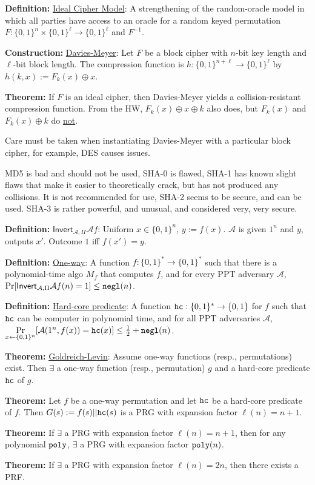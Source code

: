 \documentclass[10pt]{article}
\newcommand{\AAA}{\mathcal{A}}
\newcommand{\defn}[1]{{\bf Definition:} \underline{#1}}
\newcommand{\thm}[1]{{\bf Theorem:} \underline{#1}}
\newcommand{\con}[1]{{\bf Construction:} \underline{#1}}
\newcommand{\ExptInvtArgs}{\mathsf{Invert}_{\AAA,\Pi}}
\newcommand{\ExptInvt}{\ExptInvtArgs{\AAA}{f}}
\newcommand{\xor}{\oplus}
\newcommand{\negl}{{\tt negl}}
\newcommand{\poly}{{\tt poly}}
\newcommand{\hc}{{\tt hc}}
\newcommand{\from}{\leftarrow}
\begin{document}
\begin{multicols}{4}
\defn{Ideal Cipher Model}: A strengthening of the random-oracle model in which all parties have access to an oracle for a random keyed permutation $F:\{0,1\}^n\times\{0,1\}^\ell\to\{0,1\}^\ell$ and $F^{-1}$.

\con{Davies-Meyer}: Let $F$ be a block cipher with $n$-bit key length and $\ell$-bit block length. The compression function is $h:\{0,1\}^{n+\ell}\to\{0,1\}^\ell$ by $h(k,x):=F_k(x)\xor x$.

\thm{}If $F$ is an ideal cipher, then Davies-Meyer yields a collision-resistant compression function. From the HW, $F_k(x)\xor x\xor k$ also does, but $F_k(x)$ and $F_k(x)\xor k$ do \underline{not}.

Care must be taken when instantiating Davies-Meyer with a particular block cipher, for example, DES causes issues.

MD5 is bad and should not be used, SHA-0 is flawed, SHA-1 has known slight flaws that make it easier to theoretically crack, but has not produced any collisions. It is not recommended for use, SHA-2 seems to be secure, and can be used. SHA-3 is rather powerful, and unusual, and considered very, very secure.

\defn{$\ExptInvt$}: Uniform $x\in\{0,1\}^n$, $y:=f(x)$. $\AAA$ is given $1^n$ and $y$, outputs $x'$. Outcome $1$ iff $f(x')=y$.

\defn{One-way}: A function $f:\{0,1\}^*\to\{0,1\}^*$ such that there is a polynomial-time algo $M_f$ that computes $f$, and for every PPT adversary $\AAA$, $\Pr[\ExptInvt(n)=1]\leq\negl(n)$.

\defn{Hard-core predicate}: A function $\hc:\{0,1\}^*\to\{0,1\}$ for $f$ such that $\hc$ can be computer in polynomial time, and for all PPT adversaries $\AAA$, $\Pr\limits_{x\from\{0,1\}^n}[\AAA(1^n,f(x))=\hc(x)]\leq\frac{1}{2}+\negl(n)$.

\thm{Goldreich-Levin}: Assume one-way functions (resp., permutations) exist. Then $\exists$ a one-way function (resp., permutation) $g$ and a hard-core predicate $\hc$ of $g$.

\thm{}Let $f$ be a one-way permutation and let $\hc$ be a hard-core predicate of $f$. Then $G(s):=f(s)||\hc(s)$ is a PRG with expansion factor $\ell(n)=n+1$.

\thm{}If $\exists$ a PRG with expansion factor $\ell(n)=n+1$, then for any polynomial $\poly$, $\exists$ a PRG with expansion factor $\poly(n)$.

\thm{}If $\exists$ a PRG with expansion factor $\ell(n)=2n$, then there exists a PRF.


\end{multicols}
\end{document}

